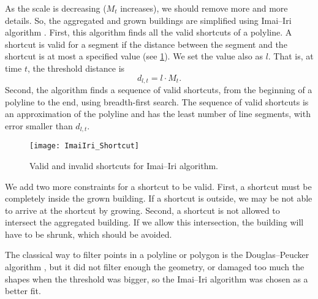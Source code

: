 As the scale is decreasing ($M_t$ increases), 
we should remove more and more details. 
So, the aggregated and grown buildings are simplified using Imai--Iri algorithm 
\citep{ImaiIri1988}.
First, this algorithm finds all the valid shortcuts of a polyline.
A shortcut is valid for a segment 
if the distance between the segment and the shortcut is at most a specified 
value
(see \fig\ref{fig:ImaiIri_Shortcut}).
We set the value also as $l$.
That is, at time $t$, the threshold distance is
\begin{equation}
\label{eq:d_lt}
d_{l,t}= l \cdot M_t.
\end{equation}
Second, the algorithm finds a sequence of valid shortcuts, from the beginning 
of a polyline to the end, using breadth-first search.
The sequence of valid shortcuts is an approximation of the polyline 
and has the least number of line segments, with error smaller than $d_{l,t}$.

\begin{figure}[tb]
	\centering
	\texttt{[image: ImaiIri\_Shortcut]}
	\caption{Valid and invalid shortcuts for Imai--Iri algorithm.}
	\label{fig:ImaiIri_Shortcut}
\end{figure}

We add two more constraints for a shortcut to be valid. 
First, a shortcut must be completely inside the grown building.
If a shortcut is outside,
we may be not able to arrive at the shortcut by growing.
Second, a shortcut is not allowed to intersect the aggregated building.
If we allow this intersection, 
the building will have to be shrunk, which should be avoided. 


The classical way to filter points in a polyline or polygon is the 
Douglas--Peucker algorithm \citep{Douglas1973}, 
but it did not filter enough the geometry, or damaged too much the shapes when 
the threshold was bigger, so the Imai--Iri 
algorithm was chosen as a better fit. 


